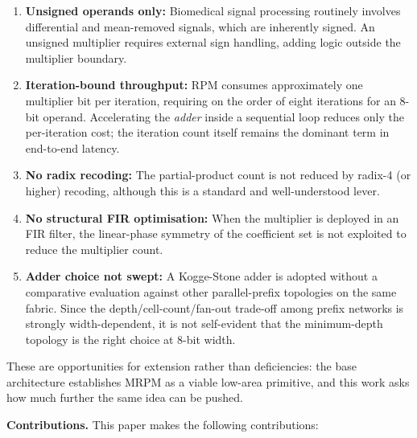 \documentclass[conference]{IEEEtran}
\begin{document}
\begin{enumerate}
  \item \textbf{Unsigned operands only:} Biomedical signal processing
  routinely involves differential and mean-removed signals, which are
  inherently signed. An unsigned multiplier requires external sign
  handling, adding logic outside the multiplier boundary.

  \item \textbf{Iteration-bound throughput:} RPM consumes approximately
  one multiplier bit per iteration, requiring on the order of eight
  iterations for an 8-bit operand. Accelerating the \emph{adder} inside
  a sequential loop reduces only the per-iteration cost; the iteration
  count itself remains the dominant term in end-to-end latency.

  \item \textbf{No radix recoding:} The partial-product count is not
  reduced by radix-4 (or higher) recoding, although this is a standard
  and well-understood lever.

  \item \textbf{No structural FIR optimisation:} When the multiplier is
  deployed in an FIR filter, the linear-phase symmetry of the
  coefficient set is not exploited to reduce the multiplier count.

  \item \textbf{Adder choice not swept:} A Kogge-Stone adder is adopted
  without a comparative evaluation against other parallel-prefix
  topologies on the same fabric. Since the depth/cell-count/fan-out
  trade-off among prefix networks is strongly width-dependent, it is not
  self-evident that the minimum-depth topology is the right choice at
  8-bit width.
\end{enumerate}

These are opportunities for extension rather than deficiencies: the base
architecture establishes MRPM as a viable low-area primitive, and this
work asks how much further the same idea can be pushed.

\smallskip\noindent\textbf{Contributions.} This paper makes the
following contributions:
\end{document}

